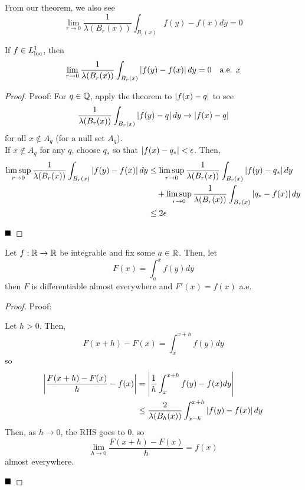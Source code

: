 From our theorem, we also see
\[ \lim_{r \to 0} \frac{1}{\lambda(B_r(x))} \int_{B_r(x)} f(y) - f(x) dy = 0 \]

\begin{lemma}
    If $f \in L^1_{\tt{loc}}$, then
    \[ \lim_{r \to 0} \frac{1}{\lambda(B_r(x))} \int_{B_r(x)} \abs{f(y) - f(x)} dy = 0 \quad \tt{a.e. } x \]
\end{lemma}
\begin{proof}{Proof:}
    For $q \in \Q$, apply the theorem to $\abs{f(x) - q}$ to see
    \[ \frac{1}{\lambda(B_r(x))} \int_{B_r(x)} \abs{f(y) - q} dy \to \abs{f(x) - q} \]
    for all $x \notin A_q$ (for a null set $A_q$).\\


    If $x \notin A_q$ for any $q$, choose $q_*$ so that $\abs{f(x) - q_*} < \epsilon$. Then,
    \begin{align*}
        \limsup_{r \to 0} \frac{1}{\lambda(B_r(x))} \int_{B_r(x)} \abs{f(y) - f(x)} dy &\leq \limsup_{r \to 0} \frac{1}{\lambda(B_r(x))} \int_{B_r(x)} \abs{f(y) - q_*} dy\\
        &\quad + \limsup_{r \to 0} \frac{1}{\lambda(B_r(x))} \int_{B_r(x)} \abs{q_* - f(x)} dy\\
        &\leq 2\epsilon
    \end{align*}

    $\qed$
\end{proof}

\begin{lemma}
    Let $f : \R \to \R$ be integrable and fix some $a \in \R$. Then, let
    \[ F(x) = \int_{a}^{x} f(y) dy \]
    then $F$ is differentiable almost everywhere and $F'(x) = f(x)$ a.e.
\end{lemma}
\begin{proof}{Proof:}

    Let $h > 0$. Then,
    \[ F(x + h) - F(x) = \int_{x}^{x + h} f(y) dy \]
    so
    \begin{align*}
        \abs{\frac{F(x + h) - F(x)}{h} - f(x)} &= \abs{\frac{1}{h}\int_{x}^{x + h} f(y) - f(x) dy}\\
        &\leq \frac{2}{\lambda(B_h(x))}\int_{x - h}^{x + h} \abs{f(y) - f(x)} dy
    \end{align*}
    Then, as $h \to 0$, the RHS goes to $0$, so
    \[ \lim_{h \to 0} \frac{F(x + h) - F(x)}{h} = f(x) \]
    almost everywhere.

    $\qed$
\end{proof}

